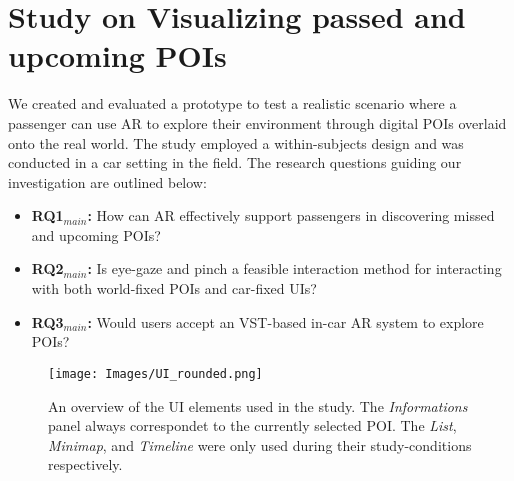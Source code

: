 \section{Study on Visualizing passed and upcoming POIs}
\label{section:study}
We created and evaluated a prototype to test a realistic scenario where a passenger can use AR to explore their environment through digital POIs overlaid onto the real world. The study employed a within-subjects design and was conducted in a car setting in the field. The research questions guiding our investigation are outlined below:
\begin{itemize}
    \item \textbf{RQ1$_{main}$:} How can AR effectively support passengers in discovering missed and upcoming POIs?
    \item \textbf{RQ2$_{main}$:} Is eye-gaze and pinch a feasible interaction method for interacting with both world-fixed POIs and car-fixed UIs?
    \item \textbf{RQ3$_{main}$:} Would users accept an VST-based in-car AR system to explore POIs?
\end{itemize}

\begin{figure*}[ht]
    \centering
    \texttt{[image: Images/UI\_rounded.png]}
    \caption{An overview of the UI elements used in the study. The \textit{Informations} panel always correspondet to the currently selected POI. The \textit{List}, \textit{Minimap}, and \textit{Timeline} were only used during their study-conditions respectively.}
    \label{fig:study_design_elements}
\end{figure*}



